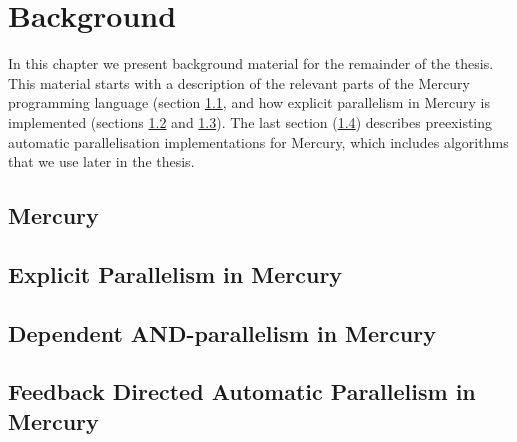 
\chapter{Background}
\label{chap:background}

In this chapter we present background material for the remainder of the
thesis.
This material starts with a description of the relevant parts of the Mercury
programming language (section \ref{sec:backgnd_mercury},
and how explicit parallelism in Mercury is implemented
(sections \ref{sec:backgnd_merpar} and \ref{sec:backgnd_deppar}).
The last section (\ref{sec:backgnd_autopar}) describes preexisting automatic
parallelisation implementations for Mercury,
which includes algorithms that we use later in the thesis.

\section{Mercury}
\label{sec:backgnd_mercury}


\section{Explicit Parallelism in Mercury}
\label{sec:backgnd_merpar}


\section{Dependent AND-parallelism in Mercury}
\label{sec:backgnd_deppar}


\section{Feedback Directed Automatic Parallelism in Mercury}
\label{sec:backgnd_autopar}



